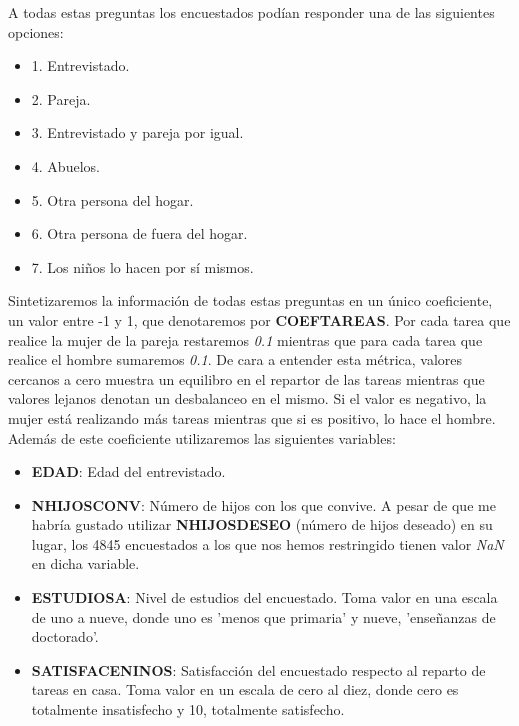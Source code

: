 \documentclass[11pt,a4paper]{article}
\begin{document}
	{\setlength{\parindent}{0cm} A todas estas preguntas los encuestados podían responder una de las siguientes opciones:}
	
	\begin{itemize}
		\item 1. Entrevistado.
		\item 2. Pareja.
		\item 3. Entrevistado y pareja por igual.
		\item 4. Abuelos.
		\item 5. Otra persona del hogar.
		\item 6. Otra persona de fuera del hogar.
		\item 7. Los niños lo hacen por sí mismos.
	\end{itemize}

	Sintetizaremos la información de todas estas preguntas en un único coeficiente, un valor entre -1 y 1, que denotaremos por \textbf{COEFTAREAS}. Por cada tarea que realice la mujer de la pareja restaremos \emph{0.1} mientras que para cada tarea que realice el hombre sumaremos \emph{0.1}. De cara a entender esta métrica, valores cercanos a cero muestra un equilibro en el repartor de las tareas mientras que valores lejanos denotan un desbalanceo en el mismo. Si el valor es negativo, la mujer está realizando más tareas mientras que si es positivo, lo hace el hombre. \\
	
	Además de este coeficiente utilizaremos las siguientes variables:
	
	\begin{itemize}
		\item \textbf{EDAD}: Edad del entrevistado.
		\item \textbf{NHIJOSCONV}: Número de hijos con los que convive. A pesar de que me habría gustado utilizar \textbf{NHIJOSDESEO} (número de hijos deseado) en su lugar, los 4845 encuestados a los que nos hemos restringido tienen valor \emph{NaN} en dicha variable.
		\item \textbf{ESTUDIOSA}: Nivel de estudios del encuestado. Toma valor en una escala de uno a nueve, donde uno es 'menos que primaria' y nueve, 'enseñanzas de doctorado'.
		\item \textbf{SATISFACENINOS}: Satisfacción del encuestado respecto al reparto de tareas en casa. Toma valor en un escala de cero al diez, donde cero es totalmente insatisfecho y 10, totalmente satisfecho.
	\end{itemize}
	
\end{document}
